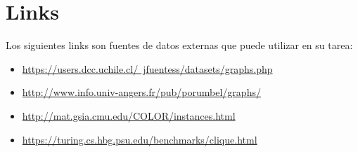 \documentclass[dcc,uchile]{fcfmcourse}
\begin{document}
\section{Links}\label{Links}
Los siguientes links son fuentes de datos externas que puede utilizar en su tarea:
\begin{itemize}
    \item \href{https://users.dcc.uchile.cl/~jfuentess/datasets/graphs.php}{https://users.dcc.uchile.cl/~jfuentess/datasets/graphs.php}
    \item \href{http://www.info.univ-angers.fr/pub/porumbel/graphs/}{http://www.info.univ-angers.fr/pub/porumbel/graphs/}
    \item \href{http://mat.gsia.cmu.edu/COLOR/instances.html}{http://mat.gsia.cmu.edu/COLOR/instances.html}
    \item \href{https://turing.cs.hbg.psu.edu/benchmarks/clique.html}{https://turing.cs.hbg.psu.edu/benchmarks/clique.html}
\end{itemize}
\end{document}
